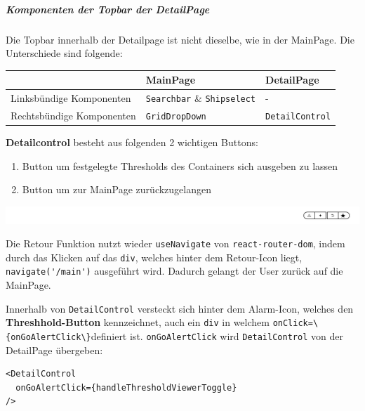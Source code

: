 \documentclass[
    headings=optiontotocandhead,%
    twoside,
    numbers=noenddot,%
    12pt, %
    titlepage, %
    parskip=full, %
    listof=leveldown, 
    numbers=noenddot, %
    a4paper,DIV=14,
    BCOR=15mm,
]{scrbook}
\newcommand{\passthrough}[1]{#1}
\let\origfigure=\figure
\let\endorigfigure=\endfigure
\renewenvironment{figure}[1][]{%
   \origfigure[H]
}{%
   \endorigfigure
}
\providecommand{\tightlist}{%
  \setlength{\itemsep}{0pt}\setlength{\parskip}{0pt}}
\begin{document}
\hypertarget{komponenten-der-topbar-der-detailpage}{%
\subparagraph{Komponenten der Topbar der
DetailPage}\label{komponenten-der-topbar-der-detailpage}}

Die Topbar innerhalb der Detailpage ist nicht dieselbe, wie in der
MainPage. Die Unterschiede sind folgende:

\begin{longtable}[]{@{}lll@{}}
\toprule
& MainPage & DetailPage\tabularnewline
\midrule
\endhead
Linksbündige Komponenten & \passthrough{\lstinline!Searchbar!} \&
\passthrough{\lstinline!Shipselect!} & -\tabularnewline
Rechtsbündige Komponenten & \passthrough{\lstinline!GridDropDown!} &
\passthrough{\lstinline!DetailControl!}\tabularnewline
\bottomrule
\end{longtable}

\textbf{Detailcontrol} besteht aus folgenden 2 wichtigen Buttons:

\begin{enumerate}
\def\labelenumi{\arabic{enumi}.}
\tightlist
\item
  Button um festgelegte Thresholds des Containers sich ausgeben zu
  lassen
\item
  Button um zur MainPage zurückzugelangen
\end{enumerate}

\begin{figure}
\centering
\includegraphics{img/Gekle/SearchbarDetail.png}
\caption{Topbar der DetailPage}
\end{figure}

Die Retour Funktion nutzt wieder \passthrough{\lstinline!useNavigate!}
von \passthrough{\lstinline!react-router-dom!}, indem durch das Klicken
auf das \passthrough{\lstinline!div!}, welches hinter dem Retour-Icon
liegt, \passthrough{\lstinline!navigate('/main')!} ausgeführt wird.
Dadurch gelangt der User zurück auf die MainPage.

Innerhalb von \passthrough{\lstinline!DetailControl!} versteckt sich
hinter dem Alarm-Icon, welches den \textbf{Threshhold-Button}
kennzeichnet, auch ein \passthrough{\lstinline!div!} in welchem
\passthrough{\lstinline!onClick=\{onGoAlertClick\}!}definiert ist.
\passthrough{\lstinline!onGoAlertClick!} wird
\passthrough{\lstinline!DetailControl!} von der DetailPage übergeben:

\begin{lstlisting}[caption={Implementierung von DetailControl in der Topbar der DetailPage}]
<DetailControl
  onGoAlertClick={handleThresholdViewerToggle}
/>
\end{lstlisting}
\end{document}

